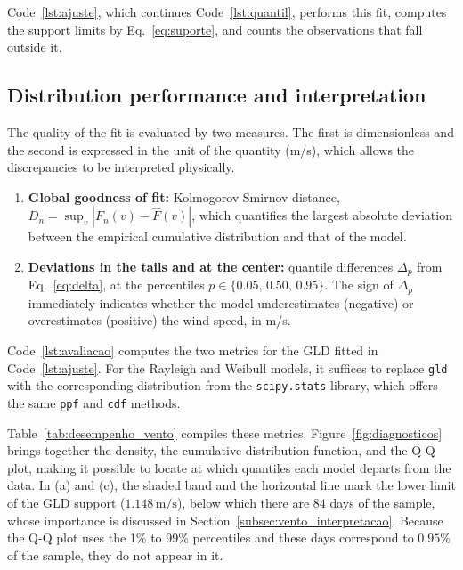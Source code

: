 Code~\ref{lst:ajuste}, which continues Code~\ref{lst:quantil}, performs this fit, computes the support limits by Eq.~\eqref{eq:suporte}, and counts the observations that fall outside it.



\subsection{Distribution performance and interpretation}

The quality of the fit is evaluated by two measures. The first is dimensionless and the second is expressed in the unit of the quantity (m/s), which allows the discrepancies to be interpreted physically.

\begin{enumerate}
    \item \textbf{Global goodness of fit:} Kolmogorov-Smirnov distance, $D_n = \sup_v |F_n(v) - \widehat{F}(v)|$, which quantifies the largest absolute deviation between the empirical cumulative distribution and that of the model.
    \item \textbf{Deviations in the tails and at the center:} quantile differences $\Delta_p$ from Eq.~\eqref{eq:delta}, at the percentiles $p \in \{0.05,\, 0.50,\, 0.95\}$. The sign of $\Delta_p$ immediately indicates whether the model underestimates (negative) or overestimates (positive) the wind speed, in m/s.
\end{enumerate}

Code~\ref{lst:avaliacao} computes the two metrics for the GLD fitted in Code~\ref{lst:ajuste}. For the Rayleigh and Weibull models, it suffices to replace \texttt{gld} with the corresponding distribution from the \texttt{scipy.stats} library, which offers the same \texttt{ppf} and \texttt{cdf} methods.



Table~\ref{tab:desempenho_vento} compiles these metrics. Figure~\ref{fig:diagnosticos} brings together the density, the cumulative distribution function, and the Q-Q plot, making it possible to locate at which quantiles each model departs from the data. In (a) and (c), the shaded band and the horizontal line mark the lower limit of the GLD support ($1.148\,\text{m/s}$), below which there are $84$ days of the sample, whose importance is discussed in Section~\ref{subsec:vento_interpretacao}. Because the Q-Q plot uses the 1\% to 99\% percentiles and these days correspond to $0.95\%$ of the sample, they do not appear in it.

